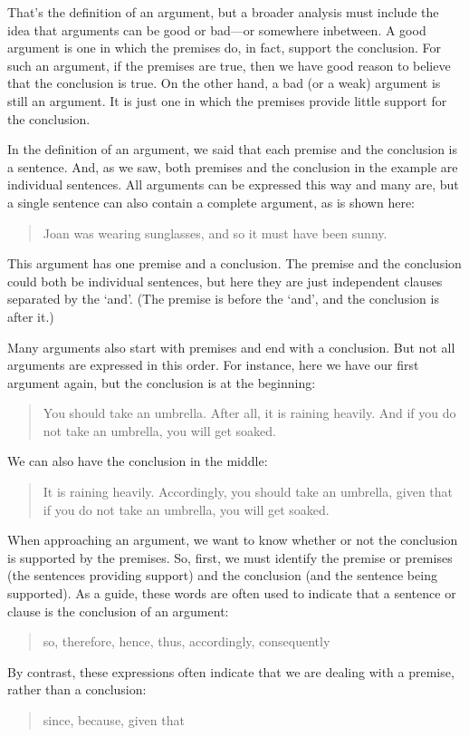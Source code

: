 That's the definition of an argument, but a broader analysis must include the idea that arguments can be good or bad---or  somewhere inbetween. A good argument is one in which the premises do, in fact, support the conclusion. For such an argument, if the premises are true, then we have good reason to believe that the conclusion is true. On the other hand, a bad (or a weak) argument is still an argument. It is just one in which the premises provide little support for the conclusion.

In the definition of an argument, we said that each premise and the conclusion is a sentence. And, as we saw, both premises and the conclusion in the example are individual sentences. All arguments can be expressed this way and many are, but a single sentence can also contain a complete argument, as is shown here:
	\begin{quote}
		 Joan was wearing sunglasses, and so it must have been sunny.
	\end{quote}
This argument has one premise and a conclusion. The premise and the conclusion could both be individual sentences, but here they are just independent clauses separated by the `and'. (The premise is before the `and', and the conclusion is after it.)

Many arguments also start with premises and end with a conclusion. But not all arguments are expressed in this order. For instance, here we have our first argument again, but the conclusion is at the beginning:
	\begin{quote}
		You should take an umbrella. After all, it is raining heavily. And if you do not take an umbrella, you will get soaked. 
	\end{quote}
We can also have the conclusion in the middle:
	\begin{quote}
		It is raining heavily. Accordingly, you should take an umbrella, given that if you do not take an umbrella, you will get soaked.
	\end{quote}

When approaching an argument, we want to know whether or not the conclusion is supported by the premises. So, first, we must identify the premise or premises (the sentences providing support) and the conclusion (and the sentence being supported). As a guide, these words are often used to indicate that a sentence or clause is the conclusion of an argument:
	\begin{quote}
		so, therefore, hence, thus, accordingly, consequently
	\end{quote}
By contrast, these expressions often indicate that we are dealing with a premise, rather than a conclusion:
	\begin{quote}
		since, because, given that
	\end{quote}

